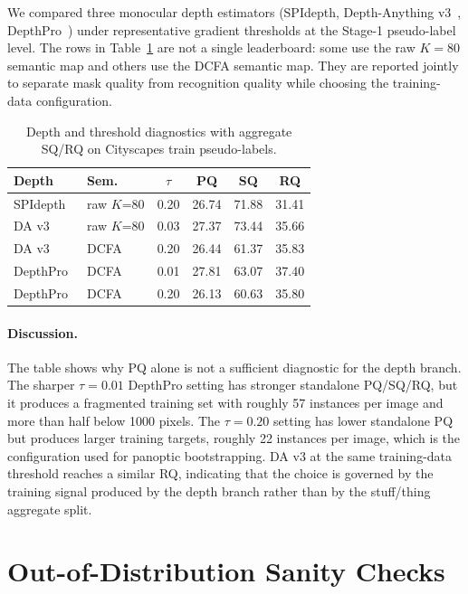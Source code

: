 \documentclass{article}
\begin{document}
We compared three monocular depth estimators (SPIdepth, Depth-Anything v3~\cite{lin2025da3}, DepthPro~\cite{bochkovskii2024depthpro}) under representative gradient thresholds at the Stage-1 pseudo-label level. The rows in Table~\ref{tab:depth} are not a single leaderboard: some use the raw $K{=}80$ semantic map and others use the DCFA semantic map. They are reported jointly to separate mask quality from recognition quality while choosing the training-data configuration.

\begin{table}[H]
\caption{Depth and threshold diagnostics with aggregate SQ/RQ on Cityscapes train pseudo-labels.}
\label{tab:depth}
\centering
\small
\setlength{\tabcolsep}{6pt}
\begin{tabular}{l l c c c c}
\toprule
Depth & Sem. & $\tau$ & PQ & SQ & RQ \\
\midrule
SPIdepth & raw $K$=80 & 0.20 & 26.74 & 71.88 & 31.41 \\
DA v3~\cite{lin2025da3} & raw $K$=80 & 0.03 & 27.37 & 73.44 & 35.66 \\
DA v3~\cite{lin2025da3} & DCFA & 0.20 & 26.44 & 61.37 & 35.83 \\
DepthPro~\cite{bochkovskii2024depthpro} & DCFA & 0.01 & 27.81 & 63.07 & 37.40 \\
DepthPro~\cite{bochkovskii2024depthpro} & DCFA & 0.20 & 26.13 & 60.63 & 35.80 \\
\bottomrule
\end{tabular}
\end{table}

\paragraph{Discussion.}
The table shows why PQ alone is not a sufficient diagnostic for the depth branch. The sharper $\tau{=}0.01$ DepthPro setting has stronger standalone PQ/SQ/RQ, but it produces a fragmented training set with roughly 57 instances per image and more than half below 1000 pixels. The $\tau{=}0.20$ setting has lower standalone PQ but produces larger training targets, roughly 22 instances per image, which is the configuration used for panoptic bootstrapping. DA v3 at the same training-data threshold reaches a similar RQ, indicating that the choice is governed by the training signal produced by the depth branch rather than by the stuff/thing aggregate split.

\section{Out-of-Distribution Sanity Checks}
\label{sec:supp:ood}
\end{document}
